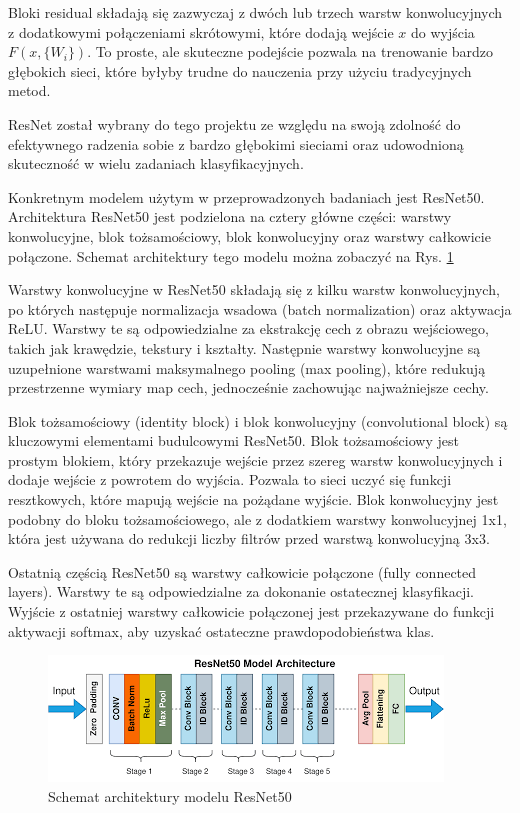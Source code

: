 Bloki residual składają się zazwyczaj z dwóch lub trzech warstw konwolucyjnych z dodatkowymi połączeniami skrótowymi, 
które dodają wejście \( x \) do wyjścia \( F(x, \{W_i\}) \). To proste, ale skuteczne podejście pozwala na trenowanie 
bardzo głębokich sieci, które byłyby trudne do nauczenia przy użyciu tradycyjnych metod.

ResNet został wybrany do tego projektu ze względu na swoją zdolność do efektywnego radzenia sobie z bardzo głębokimi 
sieciami oraz udowodnioną skuteczność w wielu zadaniach klasyfikacyjnych. 

Konkretnym modelem użytym w przeprowadzonych badaniach
jest ResNet50. Architektura ResNet50 jest podzielona na cztery główne części: warstwy konwolucyjne, blok tożsamościowy, 
blok konwolucyjny oraz warstwy całkowicie połączone. Schemat architektury tego modelu można zobaczyć na Rys. \ref*{rys:resnet}

Warstwy konwolucyjne w ResNet50 składają się z kilku warstw konwolucyjnych, po których następuje normalizacja wsadowa 
(batch normalization) oraz aktywacja ReLU. Warstwy te są odpowiedzialne za ekstrakcję cech z obrazu wejściowego, takich jak 
krawędzie, tekstury i kształty. Następnie warstwy konwolucyjne są uzupełnione warstwami maksymalnego pooling (max pooling), 
które redukują przestrzenne wymiary map cech, jednocześnie zachowując najważniejsze cechy.

Blok tożsamościowy (identity block) i blok konwolucyjny (convolutional block) są kluczowymi elementami budulcowymi ResNet50. 
Blok tożsamościowy jest prostym blokiem, który przekazuje wejście przez szereg warstw konwolucyjnych i dodaje wejście z 
powrotem do wyjścia. Pozwala to sieci uczyć się funkcji resztkowych, które mapują wejście na pożądane wyjście. Blok konwolucyjny 
jest podobny do bloku tożsamościowego, ale z dodatkiem warstwy konwolucyjnej 1x1, która jest używana do redukcji liczby filtrów 
przed warstwą konwolucyjną 3x3.

Ostatnią częścią ResNet50 są warstwy całkowicie połączone (fully connected layers). Warstwy te są odpowiedzialne za dokonanie 
ostatecznej klasyfikacji. Wyjście z ostatniej warstwy całkowicie połączonej jest przekazywane do funkcji aktywacji softmax, aby 
uzyskać ostateczne prawdopodobieństwa klas.

\begin{figure}
	\centering\includegraphics[width=.9\textwidth]{img/resnet.png}
	\caption{Schemat architektury modelu ResNet50}  \label{rys:resnet}
\end{figure}


